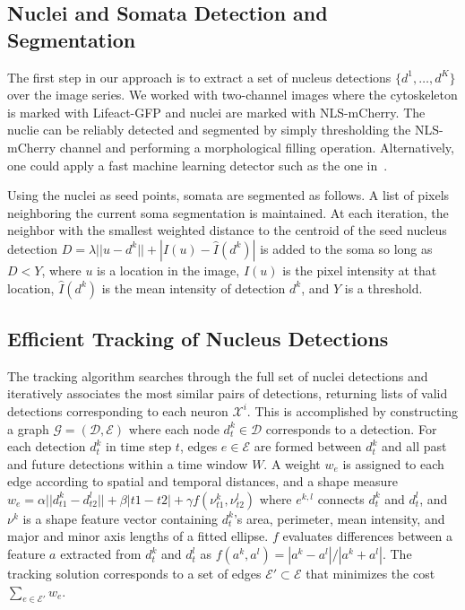 \subsection{Nuclei and Somata Detection and Segmentation}
\label{sec:detection}
\vspace{-2mm}
The  first  step in  our  approach  is to  extract  a  set of  nucleus
detections $\{d^1,\ldots,d^K\}$ over the  image series. We worked with
two-channel  images where the  cytoskeleton  is marked  with
Lifeact-GFP and  nuclei   are   marked   with
NLS-mCherry. The nuclie can be reliably detected and segmented
by simply thresholding  the NLS-mCherry channel and performing  a morphological
filling operation.  Alternatively, one could apply
a  fast machine learning detector such  as the  one
in~\cite{Smith09}.


Using  the nuclei  as  seed points,   somata are  segmented as follows. 
A list of  pixels neighboring the
current  soma  segmentation is  maintained.   At  each iteration,  the
neighbor with  the smallest weighted  distance to the centroid  of the
seed  nucleus  detection  $D  =  \lambda  ||  u  -  d^k||  +  |I(u)  -
\hat{I}(d^k)|$ is added to the soma so long as $D < Y$, where $u$ is a
location  in the  image,  $I(u)$  is  the pixel  intensity at  that
location, $\hat{I}(d^k)$ is the mean intensity of detection $d^k$, and
$Y$ is a threshold.


\vspace{-3mm}
\subsection{Efficient Tracking of Nucleus Detections}
\label{sec:tracking}
\vspace{-2mm}

The tracking  algorithm searches through the  full set of  nuclei detections and
iteratively associates the most similar  pairs of detections, returning lists of
valid  detections  corresponding  to   each  neuron  $\mathcal{X}^i$.   This  is
accomplished  by  constructing  a graph  $\mathcal{G}=(\mathcal{D},\mathcal{E})$
where each  node $d^k_t \in \mathcal{D}$  corresponds to a  detection.  For each
detection $d^k_t$ in time step $t$, edges $e \in \mathcal{E}$ are formed between
$d^k_t$ and all  past and future detections within a time  window $W$.  A weight
$w_e$ is assigned to each edge  according to spatial and temporal distances, and
a shape measure  $w_{e} = \alpha || d^k_{t1}  - d^l_{t2} || + \beta |t1  - t2| +
\gamma f(\nu^k_{t1}, \nu^l_{t2})$ where  $e^{k,l}$ connects $d^k_t$ and $d^l_t$,
and $\nu^k$ is a shape feature vector containing $d^k_t$'s area, perimeter, mean
intensity, and major  and minor axis lengths of a  fitted ellipse. $f$ evaluates
differences  between  a  feature  $a$  extracted from  $d^k_t$  and  $d^l_t$  as
$f(a^k,a^l)  =  {|a^k  -   a^l|}/{|a^k  +  a^l|}$.   The  tracking  solution
corresponds to a set of  edges $\mathcal{E'} \subset \mathcal{E}$ that minimizes
the cost $\sum_{e \in \mathcal{E'}} w_e$.

